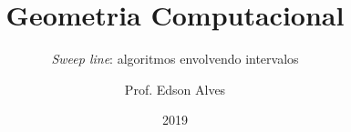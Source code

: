 \title{Geometria Computacional}
\subtitle{\textit{Sweep line}: algoritmos envolvendo intervalos} 
\date{2019}
\author{Prof. Edson Alves}
